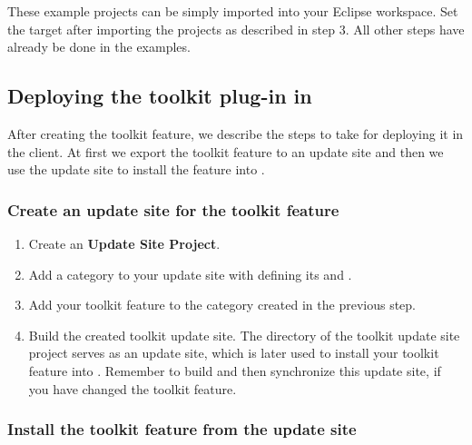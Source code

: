 These example projects can be simply imported into your Eclipse workspace. Set
the target after importing the projects as described in step 3. All other steps
have already be done in the examples.

\subsection{Deploying the toolkit plug-in in \app{}}

After creating the toolkit feature, we describe the steps to take for deploying
it in the \app{} client. At first we export the toolkit feature to an update
site and then we use the update site to install the feature into \app{}.
 
\subsubsection{Create an update site for the toolkit feature}

\begin{enumerate}
\item Create an \textbf{Update Site Project}.
\item Add a category to your update site with defining its  and
      .
\item Add your toolkit feature to the category created in the previous step.
\item Build the created toolkit update site. The directory of the toolkit
      update site project serves as an update site, which is later used to
      install your toolkit feature into \app{}. Remember to build and then
      synchronize this update site, if you have changed the toolkit feature.
\end{enumerate}

\subsubsection{Install the toolkit feature from the update site}

